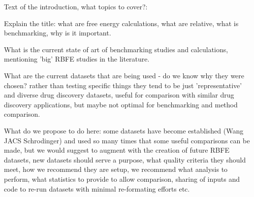 \documentclass[9pt,bestpractices]{livecoms}
\begin{document}

Text of the introduction, what topics to cover?: 

Explain the title: what are free energy calculations, what are relative, what is benchmarking, why is it important. 

What is the current state of art of benchmarking studies and calculations, mentioning 'big' RBFE studies in the literature.

What are the current datasets that are being used - do we know why they were chosen? rather than testing specific things they tend to be just  'representative' and diverse drug discovery datasets, useful for comparison with similar drug discovery applications, but maybe not optimal for benchmarking and method comparison.

What do we propose to do here: some datasets have become established (Wang JACS Schrodinger) and used so many times that some useful comparisons can be made, but we would suggest to augment with the creation of future RBFE datasets, new datasets should serve a purpose, what quality criteria they should meet, how we recommend they are setup, we recommend what analysis to perform, what statistics to provide to allow comparison, sharing of inputs and code to re-run datasets with minimal re-formating efforts etc.
\end{document}
